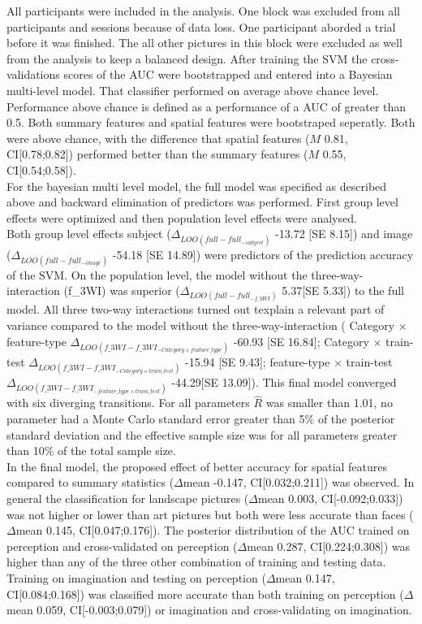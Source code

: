 \documentclass[a4paper,man,natbib,floatsintext]{apa6}
\begin{document}
All participants were included in the analysis. One block was excluded from all participants and sessions because of data loss. One participant aborded a trial before it was finished. The all other pictures in this block were excluded as well from the analysis to keep a balanced design.
After training the SVM the cross-validations scores of the AUC were bootstrapped and entered into a Bayesian multi-level model.
That classifier performed on average above chance level. Performance above chance is  defined as a performance of a AUC of greater than 0.5. Both summary features and spatial features were bootstraped seperatly. Both were above chance, with the difference that spatial features ($M$ 0.81, CI[0.78;0.82]) performed better than the summary features ($M$ 0.55, CI[0.54;0.58]). \\

For the bayesian multi level model, the full model was specified as described above and backward elimination of predictors was performed. First group level effects were optimized and then population level effects were analysed. \\
Both group level effects subject ($\Delta_{LOO(full - full_{-subject})}$ -13.72 [SE 8.15]) and image ($\Delta_{LOO(full - full_{-image})}$ -54.18 [SE  14.89]) were predictors of the prediction accuracy of the SVM. 
On the population level, the model without the three-way-interaction (f\_3WI) was superior ($\Delta_{LOO(full - full_{-f\_3WI})}$ 5.37[SE 5.33]) to the full model.  All three two-way interactions turned out texplain a relevant part of variance compared to the model without the three-way-interaction (
Category $\times$ feature-type $\Delta_{LOO(f\_3WI - f\_3WI_{-Category \times feature\_type})}$ -60.93 [SE 16.84]; 
Category $\times$ train-test $\Delta_{LOO(f\_3WI- f\_3WI_{-Category \times train\_test})}$ -15.94 [SE  9.43];
feature-type $\times$ train-test $\Delta_{LOO(f\_3WI- f\_3WI_{- feature\_type\times train\_test})}$ -44.29[SE  13.09]).
This final model converged with six diverging transitions. For all parameters $\hat{R}$ was smaller than 1.01, no parameter had a Monte Carlo standard error greater than 5\% of the posterior standard deviation and the effective sample size was for all parameters greater than 10\% of the total sample size.\\

In the final model, the proposed effect of better accuracy for spatial features compared to summary statistics ($\Delta$mean -0.147, CI[0.032;0.211]) was observed. 
In general the classification for landscape pictures ($\Delta$mean 0.003, CI[-0.092;0.033]) was not higher or lower than art pictures but both were less accurate than faces ($\Delta$mean 0.145, CI[0.047;0.176]). 
The posterior distribution of the AUC trained on perception and cross-validated on perception ($\Delta$mean 0.287, CI[0.224;0.308]) was higher than any of the three other combination of training and testing data. 
Training on imagination and testing on perception ($\Delta$mean 0.147, CI[0.084;0.168]) was classified more accurate than both training on perception ($\Delta$mean 0.059, CI[-0.003;0.079]) or imagination and cross-validating on imagination. \\
\end{document}
